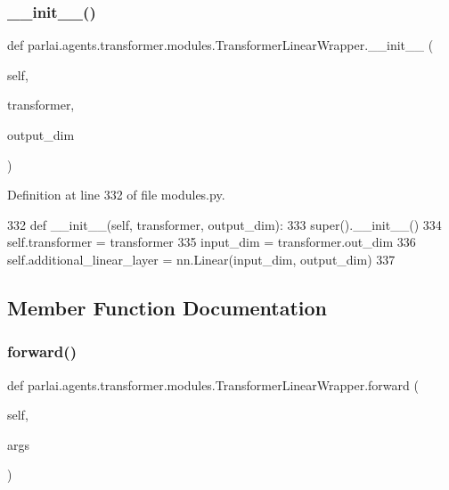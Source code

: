 \subsubsection{\texorpdfstring{\+\_\+\+\_\+init\+\_\+\+\_\+()}{\_\_init\_\_()}}
{\footnotesize\ttfamily def parlai.\+agents.\+transformer.\+modules.\+Transformer\+Linear\+Wrapper.\+\_\+\+\_\+init\+\_\+\+\_\+ (\begin{DoxyParamCaption}\item[{}]{self,  }\item[{}]{transformer,  }\item[{}]{output\+\_\+dim }\end{DoxyParamCaption})}



Definition at line 332 of file modules.\+py.


\begin{DoxyCode}
332     \textcolor{keyword}{def }\_\_init\_\_(self, transformer, output\_dim):
333         super().\_\_init\_\_()
334         self.transformer = transformer
335         input\_dim = transformer.out\_dim
336         self.additional\_linear\_layer = nn.Linear(input\_dim, output\_dim)
337 
\end{DoxyCode}


\subsection{Member Function Documentation}
\mbox{\label{classparlai_1_1agents_1_1transformer_1_1modules_1_1TransformerLinearWrapper_a82f571e85719bde36f8fcf09f27d3e4c}} 
\subsubsection{\texorpdfstring{forward()}{forward()}}
{\footnotesize\ttfamily def parlai.\+agents.\+transformer.\+modules.\+Transformer\+Linear\+Wrapper.\+forward (\begin{DoxyParamCaption}\item[{}]{self,  }\item[{}]{args }\end{DoxyParamCaption})}

